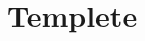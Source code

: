 \documentclass[main]{subfiles}
\begin{document}
\section{Templete}%

\ifSubfilesClassLoaded{%
  \printindex}{%
}
\end{document}
